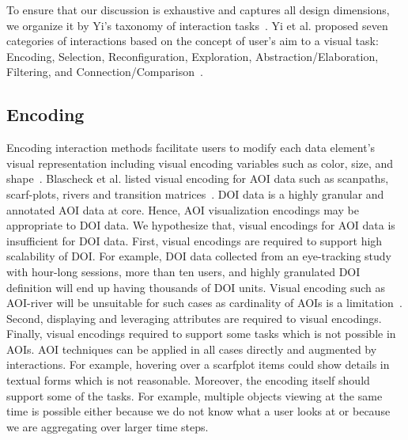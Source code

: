 To ensure that our discussion is exhaustive and captures all design dimensions, we organize it by Yi's taxonomy of interaction tasks~\cite{yi2007toward}. Yi et al. proposed seven categories of interactions based on the concept of user's aim to a visual task: Encoding, Selection, Reconfiguration, Exploration, Abstraction/Elaboration, Filtering, and Connection/Comparison~\cite{yi2007toward}. 

\subsection{Encoding}
\label{sec:Encoding}
Encoding interaction methods facilitate users to modify each data element's visual representation including visual encoding variables such as color, size, and shape~\cite{yi2007toward}. Blascheck et al. listed visual encoding for AOI data such as scanpaths, scarf-plots, rivers and transition matrices~\cite{blascheck2014state}. DOI data is a highly granular and annotated AOI data at core. Hence, AOI visualization encodings may be appropriate to DOI data. We hypothesize that, visual encodings for AOI data is insufficient for DOI data. First, visual encodings are required to support high scalability of DOI. For example, DOI data collected from an eye-tracking study with hour-long sessions, more than ten users, and highly granulated DOI definition will end up having thousands of DOI units. Visual encoding such as AOI-river will be unsuitable for such cases as cardinality of AOIs is a limitation~\cite{burch2013aoi}. Second, displaying and leveraging attributes are required to visual encodings. Finally, visual encodings required to support some tasks which is not possible in AOIs. AOI techniques can be applied in all cases directly and augmented by interactions. For example, hovering over a scarfplot items could show details in textual forms which is not reasonable. Moreover, the encoding itself should support some of the tasks. For example, multiple objects viewing at the same time is possible either because we do not know what a user looks at or because we are aggregating over larger time steps.

